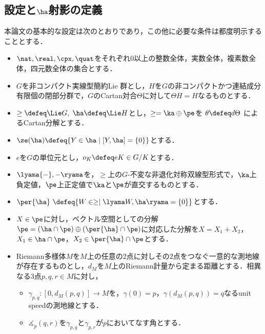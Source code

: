 
\newcommand*\ccircled[4]{\tikz[baseline=(char.base)]{
    \node[shape=circle, fill=#2, draw=#3, text=#4, inner sep=1pt] (char) {#1};}}
\newcommand{\cnum}[1]{\ccircled{#1}{MediumTurquoise!40}{MediumTurquoise!40}{black}}

\subsection{設定と$\ha$射影の定義}
本論文の基本的な設定は次のとおりであり，この他に必要な条件は都度明示することとする．

\begin{nttdef}\label{nttdef:fund}
  \leavevmode\vspace{-1em}
  \begin{itemize}
  \item $\nat,\real, \cpx,\quat$をそれぞれ0以上の整数全体，実数全体，複素数全体，四元数全体の集合とする．
  \item $G$を非コンパクト実線型簡約Lie 群とし，$H$を$G$の非コンパクトかつ連結成分有限個の閉部分群で，$G$のCartan対合$\Theta$に対して$\Theta H = H$なるものとする．

  \item $\ge \defeq \Lie G,\; \ha \defeq \Lie H$とし，$\ge = \ka\oplus \pe$を $\theta \defeq d\Theta$ によるCartan分解とする．
  \item $\ze(\ha)\defeq \{Y\in \ha\mid [Y,\ha] = \{0\} \} $とする．
  \item $e$を$G$の単位元とし，$o_K \defeq eK\in G/K$とする．
  \item $\lyama{-},{-} \ryama$を，$\ge$上の$G$-不変な非退化対称双線型形式で，$\ka$上負定値，$\pe$上正定値で$\ka$と$ \pe$が直交するものとする．
  \item $\per{\ha}\ \defeq \{W\in \ge\mid \lyama W, \ha\ryama = \{0\}\} $とする．
  \item $X\in \pe$に対し，ベクトル空間としての分解$\pe =( \ha\cap \pe)\oplus(\per{\ha}\cap \pe) $に対応した分解を$X = X_1 + X_2 $，$X_1 \in \ha\cap \pe$，$X_2\in \per{\ha}\cap \pe$とする．
  \item Riemann多様体$M$を$M$上の任意の2点に対しその2点をつなぐ一意的な測地線が存在するものとし，$d_M $を$M$上のRiemann計量から定まる距離とする．相異なる3点$p,q,r \in M$に対し，
    \begin{itemize}
    \item $\gamma_{p,q}\colon [0, d_{M}(p,q)] \to M$を，$\gamma(0) =  p$，$\gamma(d_{M}(p,q)) = q $なるunit speedの測地線とする．
    \item $\measuredangle_{p}(q, r)$を$\gamma_{p,q} $と$\gamma_{p,r} $が$p$においてなす角とする．
    \end{itemize}
  \end{itemize}  
\end{nttdef}


